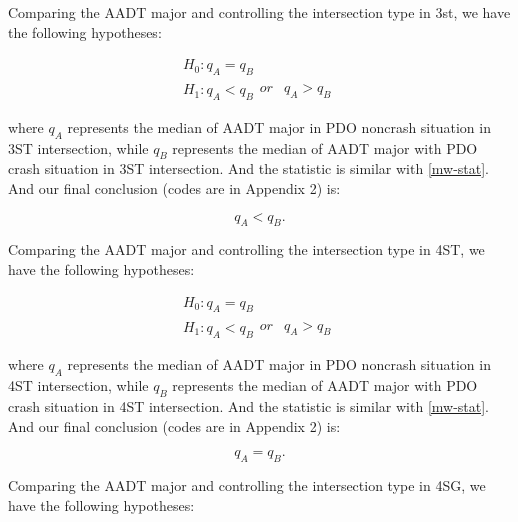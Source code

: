 \documentclass[11pt]{scrartcl} %
\begin{document}
\par

Comparing the AADT major and controlling the intersection type in 3st, we have the following hypotheses:

\begin{equation*}
\begin{array}{l}
{H_0}:{q_A} = {q_B}\\
{H_1}:{q_A} < {q_B}\begin{array}{*{20}{c}}
{or}&{{q_A} > {q_B}}
\end{array}
\end{array}
\end{equation*}

where $q_A$ represents the median of AADT major in PDO noncrash situation in 3ST intersection, while $q_B$ represents the median of AADT major with PDO crash situation in 3ST intersection. And the statistic is similar with \eqref{mw-stat}. And our final conclusion (codes are in Appendix 2) is:

\begin{equation*}
{q_A} < {q_B}.
\end{equation*}

\par

Comparing the AADT major and controlling the intersection type in 4ST, we have the following hypotheses:

\begin{equation*}
\begin{array}{l}
{H_0}:{q_A} = {q_B}\\
{H_1}:{q_A} < {q_B}\begin{array}{*{20}{c}}
{or}&{{q_A} > {q_B}}
\end{array}
\end{array}
\end{equation*}

where $q_A$ represents the median of AADT major in PDO noncrash situation in 4ST intersection, while $q_B$ represents the median of AADT major with PDO crash situation in 4ST intersection. And the statistic is similar with \eqref{mw-stat}. And our final conclusion (codes are in Appendix 2) is:

\begin{equation*}
{q_A} = {q_B}.
\end{equation*}

\par

Comparing the AADT major and controlling the intersection type in 4SG, we have the following hypotheses:
\end{document}
